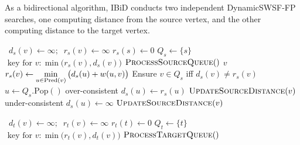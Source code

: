 {
\begin{algorithm}[t]
   \caption{As a bidirectional algorithm,
      IBiD conducts two independent DynamicSWSF-FP searches,
      one computing distance from the source vertex,
      and the other computing distance to the target vertex.}
   \label{alg:ibid-two-dynamicswsffps}
   \begin{minipage}[t]{8.2cm}
      \begin{algorithmic}[1]
          {\,\!}
               \State $d_s(v) \gets \infty; \;\; r_s(v) \gets \infty$
            \EndFor
            \State $r_s(s) \gets 0$
            \State $Q_s \gets \{ s \}$
               \Comment $\mbox{ key for } v: \min\big(r_s(v),d_s(v)\big)$
            \State $\mbox{\sc ProcessSourceQueue}()$
         \EndProcedure
          {$v$}
               \State $r_s(v) \gets \displaystyle\min_{u \in \mbox{\scriptsize Pred}(v)}
                  \big( d_s(u) + w(u,v) \big)$
            \EndIf
            \State Ensure $v \in Q_s$ iff $d_s(v) \neq r_s(v)$
         \EndProcedure
          {\,\!}
            \State $u \gets Q_s.\mbox{Pop}()$
                  \Comment over-consistent
               \State $d_s(u) \gets r_s(u)$
                  \State $\mbox{\sc UpdateSourceDistance}(v)$
               \EndFor
            \Else
                  \Comment under-consistent
               \State $d_s(u) \gets \infty$
                  \State $\mbox{\sc UpdateSourceDistance}(v)$
               \EndFor
            \EndIf
         \EndProcedure
      \end{algorithmic}
   \end{minipage}
   \quad
   \begin{minipage}[t]{8.2cm}
      \begin{algorithmic}[1]
          {\,\!}
               \State $d_t(v) \gets \infty; \;\; r_t(v) \gets \infty$
            \EndFor
            \State $r_t(t) \gets 0$
            \State $Q_t \gets \{ t \}$
               \Comment $\mbox{ key for } v: \min\big(r_t(v),d_t(v)\big)$
            \State $\mbox{\sc ProcessTargetQueue}()$
         \EndProcedure

\end{algorithmic}
\end{minipage}
\end{algorithm}}
